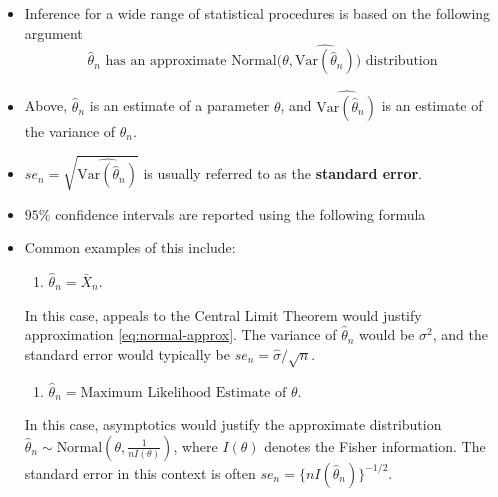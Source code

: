 \documentclass[]{book}
\providecommand{\tightlist}{%
  \setlength{\itemsep}{0pt}\setlength{\parskip}{0pt}}
\begin{document}
\begin{itemize}
\item
  Inference for a wide range of statistical procedures is based on the following argument
  \begin{equation}
  \hat{\theta}_{n} \textrm{ has an approximate Normal}\Big( \theta, \widehat{\textrm{Var}(\hat{\theta}_{n})} \Big) \textrm{ distribution }
  \label{eq:normal-approx}
  \end{equation}
\item
  Above, \(\hat{\theta}_{n}\) is an estimate of a parameter \(\theta\), and \(\widehat{\textrm{Var}(\hat{\theta}_{n})}\) is an estimate of the variance of \(\hat{\theta}_{n}\).
\item
  \(se_{n} = \sqrt{\widehat{\textrm{Var}(\hat{\theta}_{n})}}\) is usually referred to as the \textbf{standard error}.
\item
  \(95\%\) confidence intervals are reported using the following formula
  \begin{equation}
  [\hat{\theta}_{n} - 1.96 se_{n}, \hat{\theta}_{n} + 1.96 se_{n}  ]
  \end{equation}
\item
  Common examples of this include:

  \begin{enumerate}
  \def\labelenumi{\arabic{enumi}.}
  \tightlist
  \item
    \(\hat{\theta}_{n} = \bar{X}_{n}\).
  \end{enumerate}

  In this case, appeals to the Central Limit Theorem would justify approximation \eqref{eq:normal-approx}. The variance of \(\hat{\theta}_{n}\) would be \(\sigma^{2}\), and the standard error would typically be \(se_{n} = \hat{\sigma}/\sqrt{n}\).

  \begin{enumerate}
  \def\labelenumi{\arabic{enumi}.}
  \setcounter{enumi}{1}
  \tightlist
  \item
    \(\hat{\theta}_{n} = \textrm{Maximum Likelihood Estimate of } \theta\).
  \end{enumerate}

  In this case, asymptotics would justify the approximate distribution \(\hat{\theta}_{n} \sim \textrm{Normal}(\theta, \frac{1}{nI(\theta)} )\), where \(I(\theta)\) denotes the Fisher information. The standard error in this context is often \(se_{n} = \{ n I(\hat{\theta}_{n}) \}^{-1/2}\).
\end{itemize}
\end{document}
